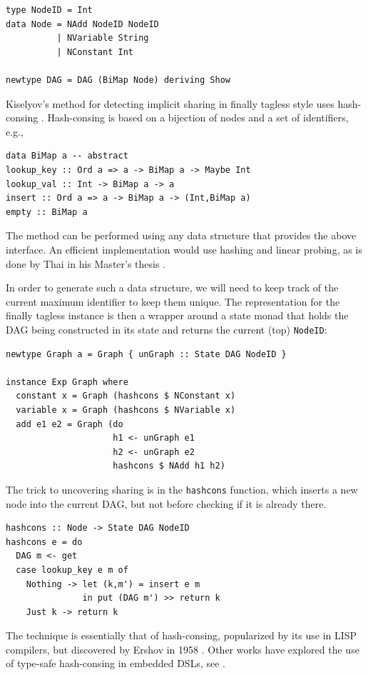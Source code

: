 \documentclass[runningheads]{llncs}
\begin{document}
\begin{verbatim}
type NodeID = Int
data Node = NAdd NodeID NodeID
          | NVariable String
          | NConstant Int

newtype DAG = DAG (BiMap Node) deriving Show
\end{verbatim}

Kiselyov's method for detecting implicit sharing in finally tagless style uses
hash-consing \cite{kiselyov:sharing}. Hash-consing is based on a bijection of
nodes and a set of identifiers, e.g.,

\begin{verbatim}
data BiMap a -- abstract
lookup_key :: Ord a => a -> BiMap a -> Maybe Int
lookup_val :: Int -> BiMap a -> a
insert :: Ord a => a -> BiMap a -> (Int,BiMap a)
empty :: BiMap a
\end{verbatim}

The method can be performed using any data structure that provides the above
interface. An efficient implementation would use hashing and linear probing, as
is done by Thai in his Master's thesis \cite{thai2021type}.

In order to generate such a data structure, we will need to keep track of the
current maximum identifier to keep them unique. The representation for the
finally tagless instance is then a wrapper around a state monad that holds the
DAG being constructed in its state and returns the current (top)
\texttt{NodeID}:

\begin{verbatim}
newtype Graph a = Graph { unGraph :: State DAG NodeID }

instance Exp Graph where
  constant x = Graph (hashcons $ NConstant x)
  variable x = Graph (hashcons $ NVariable x)
  add e1 e2 = Graph (do
                     h1 <- unGraph e1
                     h2 <- unGraph e2
                     hashcons $ NAdd h1 h2)
\end{verbatim}

The trick to uncovering sharing is in the
\texttt{hashcons} function, which inserts a new node into the current DAG, but not
before checking if it is already there.
\begin{verbatim}
hashcons :: Node -> State DAG NodeID
hashcons e = do
  DAG m <- get
  case lookup_key e m of
    Nothing -> let (k,m') = insert e m
               in put (DAG m') >> return k
    Just k -> return k
\end{verbatim}

The technique is essentially that of hash-consing, popularized by its use in
LISP compilers, but discovered by Ershov in 1958 \cite{ershov1958:consing}.
Other works have explored the use of type-safe hash-consing in embedded DSLs,
see \cite{filliatre:typesafeconsing}.
\end{document}
